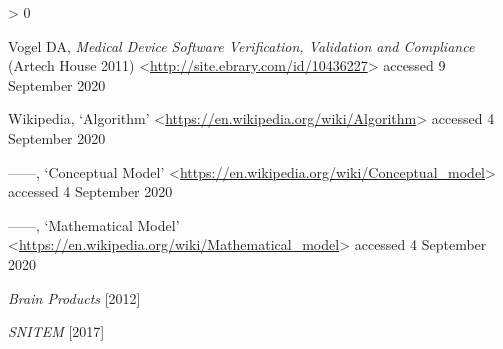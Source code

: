 \documentclass[
]{scrartcl}
\newlength{\cslhangindent}
\newenvironment{CSLReferences}[2] %
 {%
  \setlength{\parindent}{0pt}
  \ifodd #1 \everypar{\setlength{\hangindent}{\cslhangindent}}\ignorespaces\fi
  \ifnum #2 > 0
  \setlength{\parskip}{#2\baselineskip}
  \fi
 }%
 {}
\begin{document}
\begin{CSLReferences}{0}{0}
\leavevmode\hypertarget{ref-vogelMedicalDeviceSoftware2011}{}%
Vogel DA, \emph{Medical Device Software Verification, Validation and Compliance} ({Artech House} 2011) \textless{}\url{http://site.ebrary.com/id/10436227}\textgreater{} accessed 9 September 2020

\leavevmode\hypertarget{ref-wikipediaAlgorithm}{}%
Wikipedia, {`Algorithm'} \textless{}\url{https://en.wikipedia.org/wiki/Algorithm}\textgreater{} accessed 4 September 2020

\leavevmode\hypertarget{ref-wikipediaConceptualModel}{}%
------, {`Conceptual Model'} \textless{}\url{https://en.wikipedia.org/wiki/Conceptual_model}\textgreater{} accessed 4 September 2020

\leavevmode\hypertarget{ref-wikipediaMathematicalModel}{}%
------, {`Mathematical Model'} \textless{}\url{https://en.wikipedia.org/wiki/Mathematical_model}\textgreater{} accessed 4 September 2020

\leavevmode\hypertarget{ref-BrainProducts2012}{}%
\emph{Brain {Products}} {[}2012{]}

\leavevmode\hypertarget{ref-SNITEM2017}{}%
\emph{{SNITEM}} {[}2017{]}

\end{CSLReferences}
\end{document}
